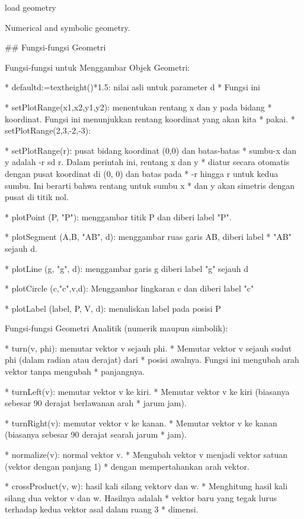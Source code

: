 \documentclass{article}
\begin{document}
\>load geometry


    Numerical and symbolic geometry.

## Fungsi-fungsi Geometri

Fungsi-fungsi untuk Menggambar Objek Geometri:


* 
defaultd:=textheight()*1.5: nilai asli untuk parameter d
* Fungsi ini

* 
setPlotRange(x1,x2,y1,y2): menentukan rentang x dan y pada bidang
* koordinat. Fungsi ini menunjukkan rentang koordinat yang akan kita
* pakai.
* setPlotRange(2,3,-2,-3):

* 
setPlotRange(r): pusat bidang koordinat (0,0) dan batas-batas
* sumbu-x dan y adalah -r sd r. Dalam perintah ini, rentang x dan y
* diatur secara otomatis dengan pusat koordinat di (0, 0) dan batas pada
* -r hingga r untuk kedua sumbu. Ini berarti bahwa rentang untuk sumbu x
* dan y akan simetris dengan pusat di titik nol.

* 
plotPoint (P, "P"): menggambar titik P dan diberi label "P".

* 
plotSegment (A,B, "AB", d): menggambar ruas garis AB, diberi label
* "AB" sejauh d.

* 
plotLine (g, "g", d): menggambar garis g diberi label "g" sejauh d

* 
plotCircle (c,"c",v,d): Menggambar lingkaran c dan diberi label "c"

* 
plotLabel (label, P, V, d): menuliskan label pada posisi P


Fungsi-fungsi Geometri Analitik (numerik maupun simbolik):


* 
turn(v, phi): memutar vektor v sejauh phi.
* Memutar vektor v sejauh sudut phi (dalam radian atau derajat) dari
* posisi awalnya. Fungsi ini mengubah arah vektor tanpa mengubah
* panjangnya.

* 
turnLeft(v):   memutar vektor v ke kiri.
* Memutar vektor v ke kiri (biasanya sebesar 90 derajat berlawanan arah
* jarum jam).

* 
turnRight(v):  memutar vektor v ke kanan.
* Memutar vektor v ke kanan (biasanya sebesar 90 derajat searah jarum
* jam).

* 
normalize(v): normal vektor v.
* Mengubah vektor v menjadi vektor satuan (vektor dengan panjang 1)
* dengan mempertahankan arah vektor.


* 
crossProduct(v, w): hasil kali silang vektorv dan w.
* Menghitung hasil kali silang dua vektor v dan w. Hasilnya adalah
* vektor baru yang tegak lurus terhadap kedua vektor asal dalam ruang 3
* dimensi.
\end{document}
